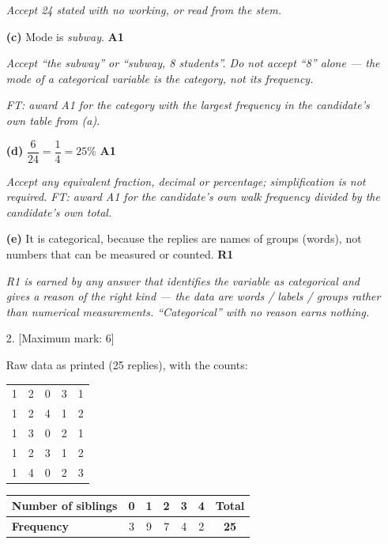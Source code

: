 \documentclass[12pt, twoside]{article}
\begin{document}
\begin{enumerate}[itemsep=0.3cm]
\emph{Accept 24 stated with no working, or read from the stem.}

\textbf{(c)} Mode is \emph{subway}. \hfill \textbf{A1}

\emph{Accept ``the subway'' or ``subway, 8 students''. Do not accept
``8'' alone --- the mode of a categorical variable is the category, not
its frequency.}

\emph{FT: award A1 for the category with the largest frequency in the
candidate's own table from (a).}

\textbf{(d)} $\dfrac{6}{24} = \dfrac{1}{4} = 25\%$ \hfill \textbf{A1}

\emph{Accept any equivalent fraction, decimal or percentage; simplification
is not required. FT: award A1 for the candidate's own walk frequency
divided by the candidate's own total.}

\textbf{(e)} It is categorical, because the replies are names of groups
(words), not numbers that can be measured or counted. \hfill \textbf{R1}

\emph{R1 is earned by any answer that identifies the variable as
categorical \emph{and} gives a reason of the right kind --- the data are
words / labels / groups rather than numerical measurements.
``Categorical'' with no reason earns nothing.}

\newpage

\item[2.] [Maximum mark: 6]

Raw data as printed (25 replies), with the counts:

{\small
\begin{center}
\begin{tabular}{ccccc}
1 & 2 & 0 & 3 & 1 \\
1 & 2 & 4 & 1 & 2 \\
1 & 3 & 0 & 2 & 1 \\
1 & 2 & 3 & 1 & 2 \\
1 & 4 & 0 & 2 & 3 \\
\end{tabular}
\end{center}}

\vspace{-0.2cm}

{\renewcommand{\arraystretch}{1.3}
\begin{center}
\begin{tabular}{|l|c|c|c|c|c|c|}
\hline
\textbf{Number of siblings} & 0 & 1 & 2 & 3 & 4 & \textbf{Total} \\ \hline
\textbf{Frequency} & 3 & 9 & 7 & 4 & 2 & \textbf{25} \\ \hline
\end{tabular}
\end{center}}


\end{enumerate}
\end{document}
